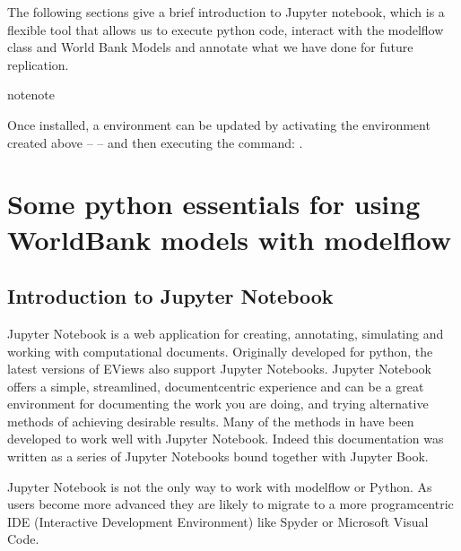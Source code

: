 \documentclass[letterpaper,10pt,english]{jupyterBook}
\begin{document}
\sphinxAtStartPar
The following sections give a brief introduction to Jupyter notebook, which is a flexible tool that allows us to execute python code, interact with the modelflow class and World Bank Models and annotate what we have done for future replication.

\begin{sphinxadmonition}{note}{note}

\sphinxAtStartPar
Once installed, a  environment can be updated by activating the  environment created above –  – and then executing the command: .
\end{sphinxadmonition}

\sphinxstepscope


\part{Some python essentials for using WorldBank models with modelflow}

\sphinxstepscope


\chapter{Introduction to  Jupyter Notebook}
\label{\detokenize{content/04_PythonEssentials/Intro_Jupyter_notebook:introduction-to-jupyter-notebook}}\label{\detokenize{content/04_PythonEssentials/Intro_Jupyter_notebook::doc}}
\sphinxAtStartPar
Jupyter Notebook is a web application for creating, annotating, simulating and working with computational documents.  Originally developed for python, the latest versions of EViews also support Jupyter Notebooks. Jupyter Notebook offers a simple, streamlined, document\sphinxhyphen{}centric experience and can be a great environment for documenting the work you are doing, and trying alternative methods of achieving desirable results.  Many of the methods in  have been developed to work well with Jupyter Notebook. Indeed this documentation was written as a series of Jupyter Notebooks bound together with Jupyter Book.

\sphinxAtStartPar
Jupyter Notebook is not the only way to work with modelflow or Python.  As users become more advanced they are likely to migrate to a more program\sphinxhyphen{}centric IDE (Interactive Development Environment) like Spyder or Microsoft Visual Code.
\end{document}
